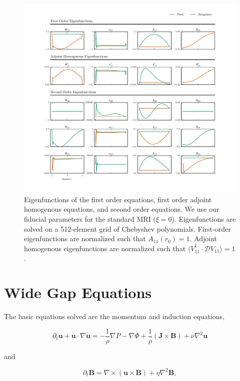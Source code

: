 \documentclass{emulateapj}
\newcommand{\beq}{\begin{equation}}
\newcommand{\eeq}{\end{equation}}
\begin{document}
\begin{figure}
\centering
\includegraphics[width=\textwidth]{../figures/widegap_orders1_2_Pm16E-7.pdf}
\caption{Eigenfunctions of the first order equations, first order adjoint homogenous equations, and second order equations. We use our fiducial parameters for the standard MRI ($\xi = 0$). Eigenfunctions are solved on a 512-element grid of Chebyshev polynomials. First-order eigenfunctions are normalized such that $A_{11}(r_0) = 1$. Adjoint homogenous eigenfunctions are normalized such that $\langle V_{11}^\dagger \cdot \mathcal{D} V_{11} \rangle = 1$.}\label{fig:linear_eigenfunctions}
\end{figure}

\section{Wide Gap Equations}
\label{sec:wide_gap}
The basic equations solved are the momentum and induction equations,

\beq\label{momentum}
\partial_t \mathbf{u} + \mathbf{u} \cdot \nabla \mathbf{u} = -\frac{1}{\rho}\nabla P - \nabla\Phi + \frac{1}{\rho} \left(\mathbf{J}\times\mathbf{B}\right) + \nu\nabla^2 \mathbf{u} 
\eeq

and

\beq\label{induction}
\partial_t \mathbf{B} = \nabla \times \left(\mathbf{u} \times \mathbf{B}\right) + \eta\nabla^2\mathbf{B},
\eeq
\end{document}
